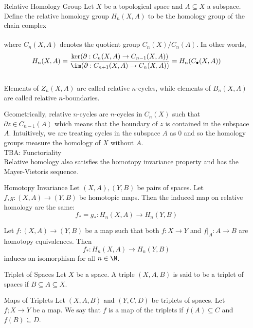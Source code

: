 \documentclass[a4paper]{article}
\begin{document}
\begin{defn}{Relative Homology Group}{} Let $X$ be a topological space and $A\subseteq X$ a subspace. Define the relative homology group $H_n(X,A)$ to be the homology group of the chain complex \\
\\
where $C_n(X,A)$ denotes the quotient group $C_n(X)/C_n(A)$. In other words, $$H_n(X,A)=\frac{\ker(\partial:C_n(X,A)\to C_{n-1}(X,A))}{\im(\partial:C_{n+1}(X,A)\to C_n(X,A))}=H_n(C_\bullet(X,A))$$~\\
Elements of $Z_n(X,A)$ are called relative $n$-cycles, while elements of $B_n(X,A)$ are called relative $n$-boundaries. 
\end{defn}

Geometrically, relative $n$-cycles are $n$-cycles in $C_n(X)$ such that $\partial z\in C_{n-1}(A)$ which means that the boundary of $z$ is contained in the subspace $A$. Intuitively, we are treating cycles in the subspace $A$ as $0$ and so the homology groups measure the homology of $X$ without $A$. \\

TBA: Functoriality\\

Relative homology also satisfies the homotopy invariance property and has the Mayer-Vietoris sequence. 

\begin{thm}{Homotopy Invariance}{} Let $(X,A),(Y,B)$ be pairs of spaces. Let $f,g:(X,A)\to(Y,B)$ be homotopic maps. Then the induced map on relative homology are the same: $$f_\ast=g_\ast:H_n(X,A)\to H_n(Y,B)$$ 
\end{thm}

\begin{crl}{}{} Let $f:(X,A)\to (Y,B)$ be a map such that both $f:X\to Y$ and $f|_A:A\to B$ are homotopy equivalences. Then $$f_\ast:H_n(X,A)\to H_n(Y,B)$$ induces an isomorphism for all $n\in\N$. 
\end{crl}

\begin{defn}{Triplet of Spaces}{} Let $X$ be a space. A triple $(X,A,B)$ is said to be a triplet of spaces if $B\subseteq A\subseteq X$. 
\end{defn}

\begin{defn}{Maps of Triplets}{} Let $(X,A,B)$ and $(Y,C,D)$ be triplets of spaces. Let $f;X\to Y$ be a map. We say that $f$ is a map of the triplets if $f(A)\subseteq C$ and $f(B)\subseteq D$. 
\end{defn}
\end{document}
